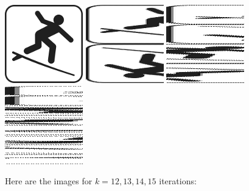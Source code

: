 \documentclass[11pt,class=report,crop=false]{standalone}
\begin{document}
\begin{cours}
\begin{center}
\includegraphics[scale=\myscale,scale=0.65]{images_chapter/surf_gimp_new_baker_0.png}\qquad
\includegraphics[scale=\myscale,scale=0.65]{images_chapter/surf_gimp_new_baker_1.png}\qquad
\includegraphics[scale=\myscale,scale=0.65]{images_chapter/surf_gimp_new_baker_2.png}\qquad
\includegraphics[scale=\myscale,scale=0.65]{images_chapter/surf_gimp_new_baker_3.png}
\end{center}


Here are the images for $k=12,13,14,15$ iterations:


\end{cours}
\end{document}
